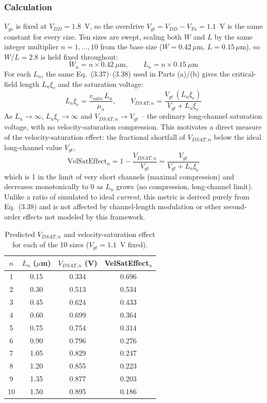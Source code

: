 \subsubsection{Calculation}

$V_{gs}$ is fixed at $V_{DD}=1.8$~V, so the overdrive $V_{gt} = V_{DD} - V_{Tn} = 1.1$~V is the same constant for every size. Ten sizes are swept, scaling both $W$ and $L$ by the same integer multiplier $n = 1,\ldots,10$ from the base size ($W=0.42\,\mu\text{m}$, $L=0.15\,\mu\text{m}$), so $W/L = 2.8$ is held fixed throughout:
\[
W_n = n \times 0.42\ \mu\text{m}, \qquad L_n = n \times 0.15\ \mu\text{m}
\]
For each $L_n$, the same Eq.~(3.37)--(3.38) used in Parts (a)/(b) gives the critical-field length $L_n\xi_c$ and the saturation voltage:
\[
L_n\xi_c = \frac{v_{satn}\,L_n}{\mu_n}, \qquad V_{DSAT,n} = \frac{V_{gt}\,(L_n\xi_c)}{V_{gt} + L_n\xi_c}
\]
As $L_n \to \infty$, $L_n\xi_c \to \infty$ and $V_{DSAT,n} \to V_{gt}$ -- the ordinary long-channel saturation voltage, with no velocity-saturation compression. This motivates a direct measure of the velocity-saturation effect: the fractional shortfall of $V_{DSAT,n}$ below the ideal long-channel value $V_{gt}$,
\[
\text{VelSatEffect}_n = 1 - \frac{V_{DSAT,n}}{V_{gt}} = \frac{V_{gt}}{V_{gt} + L_n\xi_c}
\]
which is 1 in the limit of very short channels (maximal compression) and decreases monotonically to 0 as $L_n$ grows (no compression, long-channel limit). Unlike a ratio of simulated to ideal \emph{current}, this metric is derived purely from Eq.~(3.38) and is not affected by channel-length modulation or other second-order effects not modeled by this framework.

\begin{table}[h]
  \centering
  \begin{tabular}{|c|c|c|c|}
    \hline
    $n$ & $L_n$ ($\mu$m) & $V_{DSAT,n}$ (V) & VelSatEffect$_n$ \\
    \hline
    1  & 0.15 & 0.334 & 0.696 \\
    2  & 0.30 & 0.513 & 0.534 \\
    3  & 0.45 & 0.624 & 0.433 \\
    4  & 0.60 & 0.699 & 0.364 \\
    5  & 0.75 & 0.754 & 0.314 \\
    6  & 0.90 & 0.796 & 0.276 \\
    7  & 1.05 & 0.829 & 0.247 \\
    8  & 1.20 & 0.855 & 0.223 \\
    9  & 1.35 & 0.877 & 0.203 \\
    10 & 1.50 & 0.895 & 0.186 \\
    \hline
  \end{tabular}
  \caption{Predicted $V_{DSAT,n}$ and velocity-saturation effect for each of the 10 sizes ($V_{gt}=1.1$~V fixed).}
  \label{tab:1c-vdsat}
\end{table}


